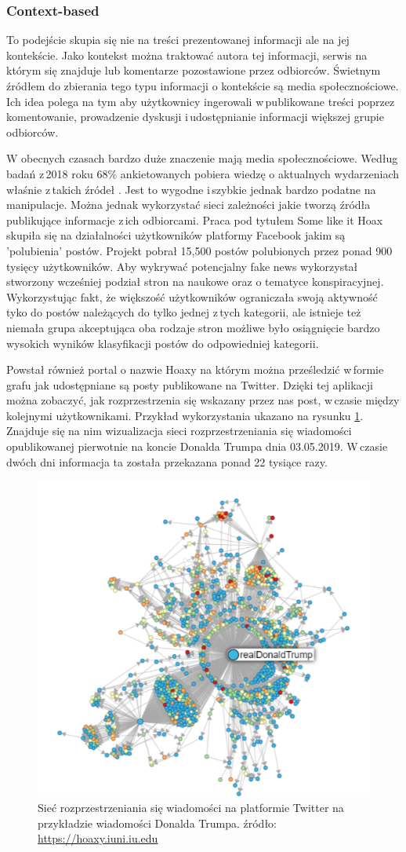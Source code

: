 \subsubsection{Context-based}
To podejście skupia się nie na treści prezentowanej informacji ale na jej kontekście. Jako kontekst można traktować autora tej informacji, serwis na którym się znajduje lub komentarze pozostawione przez odbiorców. Świetnym źródłem do zbierania tego typu informacji o kontekście są media społecznościowe. Ich idea polega na tym aby użytkownicy ingerowali w\,publikowane treści poprzez komentowanie, prowadzenie dyskusji i\,udostępnianie informacji większej grupie odbiorców.
\par
W obecnych czasach bardzo duże znaczenie mają media społecznościowe. Według badań z\,2018 roku 68\% ankietowanych pobiera wiedzę o aktualnych wydarzeniach właśnie z\,takich źródeł \cite{PewNewsUse2018}. Jest to wygodne i\,szybkie jednak bardzo podatne na manipulacje. Można jednak wykorzystać sieci zależności jakie tworzą źródła publikujące informacje z\,ich odbiorcami. Praca pod tytułem Some like it Hoax\cite{tacchini2017some} skupiła się na działalności użytkowników platformy Facebook jakim są ’polubienia’ postów. Projekt pobrał 15,500 postów polubionych przez ponad 900 tysięcy użytkowników. Aby wykrywać potencjalny fake news wykorzystał stworzony wcześniej podział stron na naukowe oraz o tematyce konspiracyjnej\cite{bessi2015science}. Wykorzystując fakt, że większość użytkowników ograniczała swoją aktywność tyko do postów należących do tylko jednej z\,tych kategorii, ale istnieje też niemała grupa akceptująca oba rodzaje stron możliwe było osiągnięcie bardzo wysokich wyników klasyfikacji postów do odpowiedniej kategorii. 
\par
Powstał również portal o nazwie Hoaxy\cite{shao2016hoaxy} na którym można prześledzić w\,formie grafu jak udostępniane są posty publikowane na Twitter. Dzięki tej aplikacji można zobaczyć, jak rozprzestrzenia się wskazany przez nas post, w\,czasie między kolejnymi użytkownikami. Przykład wykorzystania ukazano na rysunku \ref{fig:hoaxyTrump}. Znajduje się na nim wizualizacja sieci rozprzestrzeniania się wiadomości opublikowanej pierwotnie na koncie Donalda Trumpa dnia 03.05.2019. W\,czasie dwóch dni informacja ta została przekazana ponad 22 tysiące razy.
\begin{figure}[!h]
	
	\centering \includegraphics[width=0.5\linewidth]{img/hoaxy.png}
	\caption{Sieć rozprzestrzeniania się wiadomości na platformie Twitter na przykładzie wiadomości Donalda Trumpa. źródło: \url{https://hoaxy.iuni.iu.edu}}
	\label{fig:hoaxyTrump}
\end{figure}
